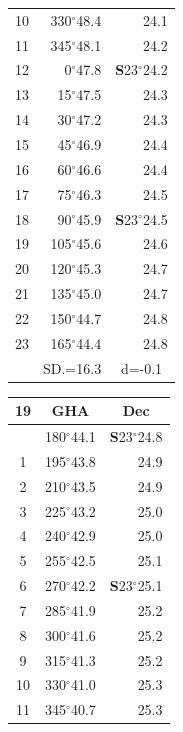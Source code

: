 \documentclass[10pt, a4paper]{report}
\begin{document}
\begin{scriptsize}
\begin{tabular*}{0.2\textwidth}[t]{@{\extracolsep{\fill}}|c|rr|}
10 & 330$^\circ$48.4 & 24.1\\
11 & 345$^\circ$48.1 & 24.2\\[2Pt]
12 & 0$^\circ$47.8 & \textbf{S}23$^\circ$24.2\\
13 & 15$^\circ$47.5 & 24.3\\
14 & 30$^\circ$47.2 & 24.3\\
15 & 45$^\circ$46.9 & \raisebox{0.24ex}{\boldmath$\cdot$~\boldmath$\cdot$~~}24.4\\
16 & 60$^\circ$46.6 & 24.4\\
17 & 75$^\circ$46.3 & 24.5\\[2Pt]
18 & 90$^\circ$45.9 & \textbf{S}23$^\circ$24.5\\
19 & 105$^\circ$45.6 & 24.6\\
20 & 120$^\circ$45.3 & 24.7\\
21 & 135$^\circ$45.0 & \raisebox{0.24ex}{\boldmath$\cdot$~\boldmath$\cdot$~~}24.7\\
22 & 150$^\circ$44.7 & 24.8\\
23 & 165$^\circ$44.4 & 24.8\\
\hline
\rule{0pt}{2.4ex} & \multicolumn{1}{c}{SD.=16.3} & \multicolumn{1}{c|}{d=-0.1}\\
\hline
\end{tabular*}\noindent
\begin{tabular*}{0.2\textwidth}[t]{@{\extracolsep{\fill}}|c|rr|}
\hline
\multicolumn{1}{|c|}{\rule{0pt}{2.6ex}\textbf{19}} & \multicolumn{1}{c}{\textbf{GHA}} & \multicolumn{1}{c|}{\textbf{Dec}}\\
\hline\rule{0pt}{2.6ex}\noindent
0 & 180$^\circ$44.1 & \textbf{S}23$^\circ$24.8\\
1 & 195$^\circ$43.8 & 24.9\\
2 & 210$^\circ$43.5 & 24.9\\
3 & 225$^\circ$43.2 & \raisebox{0.24ex}{\boldmath$\cdot$~\boldmath$\cdot$~~}25.0\\
4 & 240$^\circ$42.9 & 25.0\\
5 & 255$^\circ$42.5 & 25.1\\[2Pt]
6 & 270$^\circ$42.2 & \textbf{S}23$^\circ$25.1\\
7 & 285$^\circ$41.9 & 25.2\\
8 & 300$^\circ$41.6 & 25.2\\
9 & 315$^\circ$41.3 & \raisebox{0.24ex}{\boldmath$\cdot$~\boldmath$\cdot$~~}25.2\\
10 & 330$^\circ$41.0 & 25.3\\
11 & 345$^\circ$40.7 & 25.3\\[2Pt]

\end{tabular*}
\end{scriptsize}
\end{document}
